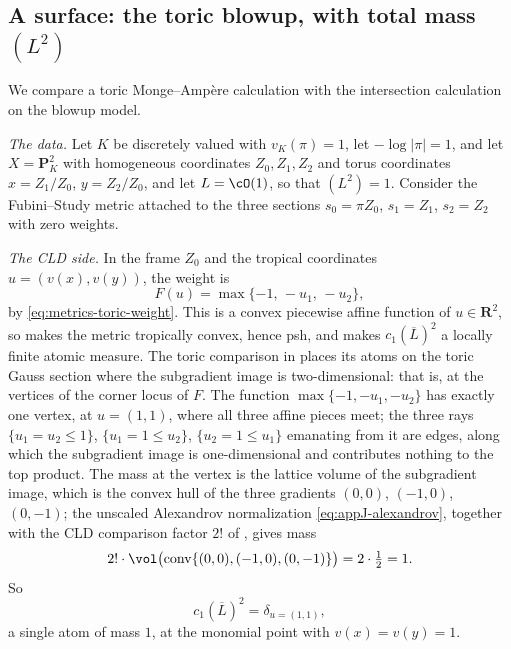 \subsection{A surface: the toric blowup, with total mass \texorpdfstring{$(L^2)$}{(L2)}}
\label{sec:ch17-check-surface}

\begin{example}
\label{ex:ch17-check-toric-surface}
We compare a toric Monge--Amp\`ere calculation with the intersection
calculation on the blowup model.

\emph{The data.}  Let $K$ be discretely valued with $v_K(\pi)=1$, let
$-\log|\pi|=1$, and let $X=\mathbf P^2_K$ with homogeneous
coordinates $Z_0,Z_1,Z_2$ and torus
coordinates $x=Z_1/Z_0$, $y=Z_2/Z_0$, and let $L=\cO(1)$, so that
$(L^2)=1$.  Consider the Fubini--Study metric attached to the three
sections $s_0=\pi Z_0$, $s_1=Z_1$, $s_2=Z_2$ with zero weights.

\emph{The CLD side.}  In the frame $Z_0$ and the tropical coordinates
$u=(v(x),v(y))$, the weight is
\[
 F(u)=\max\{-1,\,-u_1,\,-u_2\},
\]
by \eqref{eq:metrics-toric-weight}.  This is a convex piecewise affine
function of $u\in\mathbf R^2$, so
 makes the metric tropically convex, hence
psh, and  makes $c_1(\overline L)^2$ a
locally finite atomic measure.  The toric comparison in 
places its atoms on the toric Gauss section where the subgradient image
is two-dimensional: that is, at the vertices of the corner locus of $F$.  The
function $\max\{-1,-u_1,-u_2\}$ has exactly one vertex, at
$u=(1,1)$, where all three affine pieces meet; the three rays
$\{u_1=u_2\le1\}$, $\{u_1=1\le u_2\}$, $\{u_2=1\le u_1\}$ emanating
from it are edges, along which the subgradient image is one-dimensional and
contributes nothing to the top product.  The mass at the vertex is the
lattice volume of the subgradient image, which is the convex hull of the
three gradients $(0,0)$, $(-1,0)$, $(0,-1)$; the unscaled Alexandrov normalization
\eqref{eq:appJ-alexandrov}, together with the CLD comparison factor $2!$
of , gives mass
\[
 2!\cdot\vol\bigl(\operatorname{conv}\{(0,0),(-1,0),(0,-1)\}\bigr)
 =2\cdot\tfrac12=1 .
\]
So
\begin{equation}
\label{eq:ch17-toric-cld}
 c_1(\overline L)^2=\delta_{u=(1,1)},
\end{equation}
a single atom of mass $1$, at the monomial point with
$v(x)=v(y)=1$.


\end{example}
